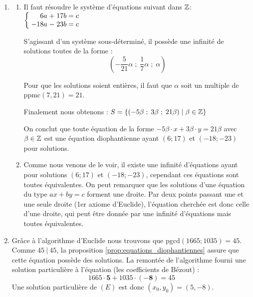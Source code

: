 \begin{enumerate}[label=\thechapter.\arabic*, font=\bfseries, itemsep=7mm,labelsep*=3mm,left=0mm]
\smallskip
Il suffit de choisir aléatoirement $a,b \in \N$ puis de calculer $c\in \N$ tel que $a\cdot 24+b\cdot 72=c$.




\item
\begin{enumerate}[label=\alph*),itemsep=5mm,left=-1mm,labelsep*=2mm]
\vspace{-3mm}
\item Il faut résoudre le système d'équations suivant dans $\mathbb{Z}$:
$\left\lbrace\begin{array}{@{\eh{1}}r@{\eh{1}}c@{\eh{1}}c@{\eh{1}}c@{\eh{1}}l}
6a   & + & 17b & = & c\\
-18a & - & 23b & = & c\\
\end{array}\right.$

S'agissant d'un système sous-déterminé, il possède une infinité de solutions toutes de la forme :
$$\left(-\frac{5}{21}\alpha\; ;\; \frac{1}{7}\alpha \; ;\; \alpha \right)$$

Pour que les solutions soient entières, il faut que $\alpha$ soit un multiple de ppmc$(7,21)=21$. 

\smallskip
Finalement nous obtenons : $S=\lbrace \left(-5\beta\; ;\; 3\beta \; ;\; 21\beta \right) \mid \beta\in \mathbb{Z} \rbrace$

\smallskip
On conclut que toute équation de la forme $-5\beta\cdot x+ 3\beta\cdot y = 21\beta$ avec $\beta\in \mathbb{Z}$ est une équation diophantienne ayant $(6;17)$ et $(-18;-23)$ pour solutions.

\item Comme nous venons de le voir, il existe une infinité d'équations ayant pour solutions $(6;17)$ et $(-18;-23)$, cependant ces équations sont toutes équivalentes. On peut remarquer que les solutions d'une équation du type $ax+by=c$ forment une droite. Par deux points passant une et une seule droite (1er axiome d'Euclide), l'équation cherchée est donc celle d'une droite, qui peut être donnée par une infinité d'équations mais toutes équivalentes. 
\end{enumerate}




\item 
Grâce à l'algorithme d'Euclide nous trouvons que pgcd$(1665;1035)=45$. Comme $45\ | \ 45$, la proposition \ref{prop:equations_diophantiennes} assure que cette équation possède des solutions. La remontée de l'algorithme fourni une solution particulière à l'équation (les coefficients de Bézout) : 
$$1665\cdot \bm{5} + 1035 \cdot \bm{(-8)} = 45$$
Une solution particulière de $(E)$ est donc $(x_0,y_0) = (5,-8)$.


\end{enumerate}
